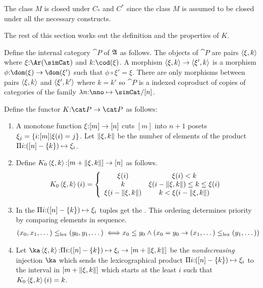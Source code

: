 \documentclass[csh.tex]{subfiles}
\begin{document}
\begin{remark} 
The class $M$ is closed under $C_*$ and $C^*$ since the class $M$ is assumed to be closed under all the necessary constructs. \end{remark}


The rest of this section works out the definition and the properties of $K$.

\begin{definition}
Define the internal category $\cat P$ of $\mathfrak A$ as follows. The objects of $\cat P$ are pairs $\left\langle \xi,k \right\rangle$ where $\xi\of\Ar(\simCat)$ and $k\of \cod(\xi)$. A morphism $\left\langle \xi,k \right\rangle\to \left\langle \xi',k \right\rangle$ is a morphism $\phi\of \dom(\xi)\to \dom(\xi')$ such that $\phi\circ \xi'= \xi$. There are only morphisms between pairs $\left\langle \xi,k \right\rangle$ and $\left\langle \xi',k' \right\rangle$ where $k=k'$ so $\cat P$ is a indexed coproduct of copies of categories of the family $\function{n\of\nno}\simCat/[n]$.

Define the functor $K\of \cat P\to\cat P$ as follows:
\begin{enumerate}
\item A monotone function $\xi\mathord :[m]\to[n]$ cuts $[m]$ into $n + 1$ posets $\xi_j = \left\{i\mathord :[m]|\xi(i)=j\right\}$. 
 Let $\Vert \xi,k \Vert$ be the number of elements of the product $\Pi i\mathord : ([n]-\left\{k\right\}) \mapsto{\xi_i}$. 
\item Define $K_0\left\langle \xi,k \right\rangle\mathord : [m+\Vert \xi,k \Vert]\to [n]$ as follows.
\[ 
	K_0\left\langle \xi,k \right\rangle(i) = \left\{
		\begin{array}{cc}
			\xi(i) & \xi(i)<k \\
			k & \xi(i-\Vert \xi,k \Vert)\leq k \leq \xi(i)\\
			\xi(i-\Vert \xi,k \Vert) & k<\xi(i-\Vert \xi,k \Vert)
		\end{array}
	\right.
\]

\item In the  $\Pi i\mathord :([n]-\left\{k\right\}) \mapsto{\xi_i}$ tuples get the . This ordering determines priority by comparing elements in sequence.
\begin{align*} 
(x_0,x_1,\dotsc) \leq_{\rm lex} (y_0,y_1,\dotsc) \iff& x_0\leq y_0 \land (x_0=y_0 \to (x_1,\dotsc)\leq_{\rm lex}(y_1,\dotsc))
\end{align*}

\item Let $\ka\tuplet{\xi,k}\of\product{i\of([n]-\set k)}{\xi_i} \to [m+\norm{\xi,k}]$ be the \emph{nondecreasing} injection $\ka$ which sends the lexicographical product $\Pi i\mathord :([n]-\left\{k\right\}) \mapsto{\xi_i}$ to the interval in $[m+\Vert \xi,k \Vert]$ which starts at the least $i$ such that $K_0\left\langle \xi,k \right\rangle(i)=k$.


\end{enumerate}
\end{definition}
\end{document}
